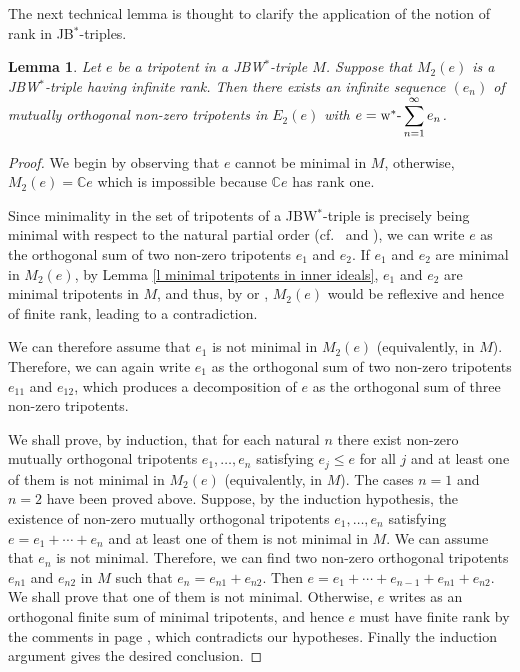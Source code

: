 \documentclass[10pt]{amsart}
\newtheorem{lemma}[theorem]{Lemma}
\begin{document}
	The next technical lemma is thought to clarify the application of the notion of rank in JB$^*$-triples.
	
	\begin{lemma}\label{l tripotent of infinite rank} Let $e$ be a tripotent in a JBW$^*$-triple $M$. Suppose that $M_2(e)$ is a JBW$^*$-triple having infinite rank. Then there exists an infinite sequence $(e_n)$ of mutually orthogonal non-zero tripotents in $E_2(e)$ with $\displaystyle e = \hbox{w$^*$-}\sum_{n=1} ^{\infty} e_n $.
	\end{lemma}
	
	\begin{proof} We begin by observing that $e$ cannot be minimal in $M$, otherwise, $M_2(e) = \mathbb{C} e$ which is impossible because $\mathbb{C} e$ has rank one.
		
		Since minimality in the set of tripotents of a JBW$^*$-triple is precisely being minimal with respect to the natural partial order (cf.\ \cite[Corollary 4.8]{EdRutt88} and \cite[Lemma 4.7]{Batt91}), we can write $e$ as the orthogonal sum of two non-zero tripotents $e_1$ and $e_2$. If $e_1$ and $e_2$ are minimal in $M_2(e)$, by Lemma \ref{l minimal tripotents in inner ideals}, $e_1$ and $e_2$ are minimal tripotents in $M$, and thus, by \cite[Lemma 2.7]{FerMarPe2004} or \cite[Lemma 3.6]{KalPe2021}, $M_2(e)$ would be reflexive and hence of finite rank, leading to a contradiction.
		
		We can therefore assume that $e_1$ is not minimal in $M_2(e)$ (equivalently, in $M$). Therefore, we can again write $e_1$ as the orthogonal sum of two non-zero tripotents $e_{11}$ and $e_{12}$, which produces a decomposition of $e$ as the orthogonal sum of three non-zero tripotents.
		
		We shall prove, by induction, that for each natural $n$ there exist non-zero mutually orthogonal tripotents $e_1, \ldots, e_n$ satisfying $e_j \leq e$ for all $j$ and at least one of them is not minimal in $M_2(e)$ (equivalently, in $M$). The cases $n=1$ and $n=2$ have been proved above. Suppose, by the induction hypothesis, the existence of non-zero mutually orthogonal tripotents $e_1, \ldots, e_n$ satisfying $e= e_1+ \cdots + e_{n}$ and at least one of them is not minimal in $M$. We can assume that $e_n$ is not minimal. Therefore, we can find two non-zero orthogonal tripotents $e_{n1}$ and $e_{n2}$ in $M$ such that $e_n = e_{n1} + e_{n2}$. Then $  e= e_1+ \cdots + e_{n-1}+ e_{n1} + e_{n2}.$ We shall prove that one of them is not minimal. Otherwise, $e$ writes as an orthogonal finite sum of minimal tripotents, and hence $e$ must have finite rank by the comments in page \pageref{finite rank of tripotents}, which contradicts our hypotheses. Finally the induction argument gives the desired conclusion.
	\end{proof}
	
\end{document}
